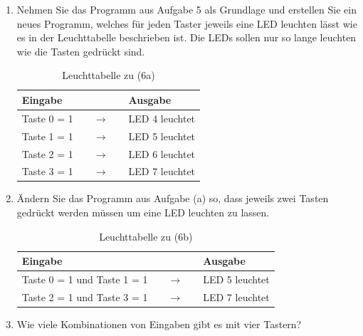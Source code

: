 \begin{enumerate}[label=(\alph*)]
	\item Nehmen Sie das Programm aus Aufgabe 5 als Grundlage und
	erstellen Sie ein neues Programm, welches für jeden Taster jeweils
	eine LED leuchten lässt wie es in der Leuchttabelle beschrieben ist.
	Die LEDs sollen nur so lange leuchten wie die Tasten gedrückt sind.

	\begin{table}[h!]
		\centering
		\begin{tabular}{lcl}
			\textbf{Eingabe} & & \textbf{Ausgabe} \\ \hline
			Taste 0 = 1 
				& $ \quad \rightarrow \quad$ 
					& LED 4 leuchtet \\
			Taste 1 = 1 
				& $ \quad \rightarrow \quad $ 
					& LED 5 leuchtet \\
			Taste 2 = 1 
				& $ \quad \rightarrow \quad $ 
					& LED 6 leuchtet \\
			Taste 3 = 1 & $\rightarrow$ & LED 7 leuchtet \\
		\end{tabular}
		\caption{Leuchttabelle zu (6a)}	
	\end{table}
	
	\item Ändern Sie das Programm aus Aufgabe (a) so, dass jeweils zwei
	Tasten gedrückt werden müssen um eine LED leuchten zu lassen.

	\begin{table}[h!]
		\centering
		\begin{tabular}{lcl}
			\textbf{Eingabe} & & \textbf{Ausgabe} \\ \hline
			Taste 0 = 1 und Taste 1 = 1 
				& $ \quad \rightarrow \quad $ 
					& LED 5 leuchtet \\
			Taste 2 = 1 und Taste 3 = 1
				& $ \quad \rightarrow \quad $ 
					& LED 7 leuchtet \\
		\end{tabular}
		\caption{Leuchttabelle zu (6b)}	
	\end{table}
	\item \* Wie viele Kombinationen von Eingaben gibt es mit vier 
	Tastern?
\end{enumerate}

\ifteacher
\newpage
